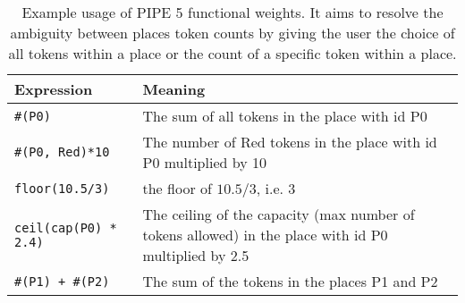 
\begin{table}[tb]
\begin{center}
  \begin{tabular}{| l | p{10cm} |}
    \hline
    Expression & Meaning \\ 
    \hline
    \texttt{\#(P0)} & The sum of all tokens in the place with id P0 \\
    
    
    \hline
    \texttt{\#(P0, Red)*10} & The number of Red tokens in the place with id P0 multiplied by 10\\
    
    \hline
    \texttt{floor(10.5/3)} & the floor of $10.5/3$, i.e. $3$\\
    
    \hline
    \texttt{ceil(cap(P0) * 2.4)} & The ceiling of the capacity (max number of tokens allowed) in the place with id P0 multiplied by 2.5 \\


    \hline
    \texttt{\#(P1) + \#(P2)} & The sum of the tokens in the places P1 and P2 \\
    \hline

  \end{tabular}
\caption{Example usage of PIPE 5 functional weights. It aims to resolve the ambiguity between places token counts by giving the user the choice of all tokens within a place or the count of a specific token within a place.}
\label{tbl:functional_weights}
\end{center}
\end{table}
